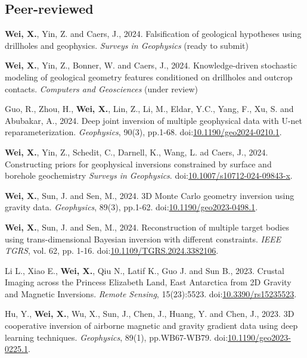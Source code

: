 \documentclass[11pt, a4paper]{article}
\newcommand{\LastName}{Wei}
\newcommand{\Initials}{X}
\newcommand{\Wei}{\textbf{\LastName, \Initials.}}  %
\newcommand{\Review}{under review}
\newcommand{\DOI}[1]{doi:\href{https://doi.org/#1}{#1}}
\begin{document}
\subsection*{Peer-reviewed}
\begin{etaremune}	
	\item
	\Wei, Yin, Z. and Caers, J., 2024. Falsification of geological hypotheses using drillholes and geophysics. \emph{Surveys in Geophysics} (ready to submit)	
	
	\item
	\Wei, Yin, Z., Bonner, W. and Caers, J., 2024. Knowledge-driven stochastic modeling of geological geometry features conditioned on drillholes and outcrop contacts. \emph{Computers and Geosciences} (\Review)
	
	\item
	Guo, R., Zhou, H., \Wei, Lin, Z., Li, M., Eldar, Y.C., Yang, F., Xu, S. and Abubakar, A., 2024. Deep joint inversion of multiple geophysical data with U-net reparameterization. \emph{Geophysics}, 90(3), pp.1-68. \DOI{10.1190/geo2024-0210.1}. 
	
	\item 
	\Wei, Yin, Z., Schedit, C., Darnell, K., Wang, L. ad Caers, J., 2024. Constructing priors for geophysical inversions constrained by surface and borehole geochemistry \emph{Surveys in Geophysics}. \DOI{10.1007/s10712-024-09843-x}.
	
	\item
	\Wei, Sun, J. and Sen, M., 2024. 3D Monte Carlo geometry inversion using gravity data. \emph{Geophysics}, 89(3), pp.1-62. \DOI{10.1190/geo2023-0498.1}.
	
	\item
	\Wei, Sun, J. and Sen, M., 2024. Reconstruction of multiple target bodies using trans-dimensional Bayesian inversion with different constraints. \emph{IEEE TGRS}, vol. 62, pp. 1-16. \DOI{10.1109/TGRS.2024.3382106}. 
	
	\item
	Li L., Xiao E., \Wei, Qiu N., Latif K., Guo J. and Sun B., 2023. Crustal Imaging across the Princess Elizabeth Land, East Antarctica from 2D Gravity and Magnetic Inversions. \emph{Remote Sensing}, 15(23):5523. \DOI{10.3390/rs15235523}.
	
	\item
	Hu, Y., \Wei, Wu, X., Sun, J., Chen, J., Huang, Y. and Chen, J., 2023. 3D cooperative inversion of airborne magnetic and gravity gradient data using deep learning techniques. \emph{Geophysics}, 89(1), pp.WB67-WB79. \DOI{10.1190/geo2023-0225.1}.
	

\end{etaremune}
\end{document}
